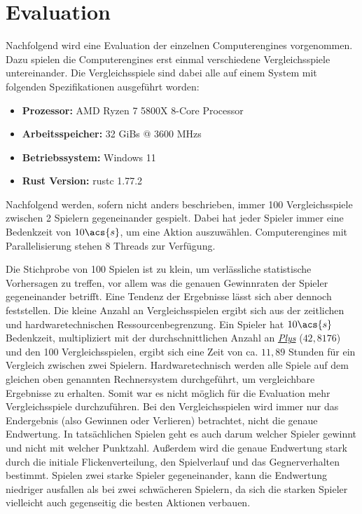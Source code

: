 \chapter{Evaluation}
\label{chapter:evaluation}


Nachfolgend wird eine Evaluation der einzelnen Computerengines vorgenommen. Dazu spielen die Computerengines erst einmal verschiedene Vergleichsspiele untereinander. Die Vergleichsspiele sind dabei alle auf einem System mit folgenden Spezifikationen ausgeführt worden:

\begin{itemize}
    \item \vspace{-0.15cm} \textbf{Prozessor:} \ac{AMD} Ryzen 7 5800X 8-Core Processor
    \item \vspace{-0.15cm} \textbf{Arbeitsspeicher:} 32 \acsp{GiB} @ 3600 \acsp{MHz}
    \item \vspace{-0.15cm} \textbf{Betriebssystem:} Windows 11
    \item \vspace{-0.15cm} \textbf{Rust Version:} rustc 1.77.2
\end{itemize}

Nachfolgend werden, sofern nicht anders beschrieben, immer 100 Vergleichsspiele zwischen 2 Spielern gegeneinander gespielt. Dabei hat jeder Spieler immer eine Bedenkzeit von $10\acs{s}$, um eine Aktion auszuwählen. Computerengines mit Parallelisierung stehen 8 Threads zur Verfügung.

Die Stichprobe von 100 Spielen ist zu klein, um verlässliche statistische Vorhersagen zu treffen, vor allem was die genauen Gewinnraten der Spieler gegeneinander betrifft. Eine Tendenz der Ergebnisse lässt sich aber dennoch feststellen. Die kleine Anzahl an Vergleichsspielen ergibt sich aus der zeitlichen und hardwaretechnischen Ressourcenbegrenzung. Ein Spieler hat $10\acs{s}$ Bedenkzeit, multipliziert mit der durchschnittlichen Anzahl an \hyperref[text:ply]{\emph{Plys}} ($42{,}8176$) und den 100 Vergleichsspielen, ergibt sich eine Zeit von ca. $11,89$ Stunden für ein Vergleich zwischen zwei Spielern. Hardwaretechnisch werden alle Spiele auf dem gleichen oben genannten Rechnersystem durchgeführt, um vergleichbare Ergebnisse zu erhalten. Somit war es nicht möglich für die Evaluation mehr Vergleichsspiele durchzuführen. Bei den Vergleichsspielen wird immer nur das Endergebnis (also Gewinnen oder Verlieren) betrachtet, nicht die genaue Endwertung. In tatsächlichen Spielen geht es auch darum welcher Spieler gewinnt und nicht mit welcher Punktzahl. Außerdem wird die genaue Endwertung stark durch die initiale Flickenverteilung, den Spielverlauf und das Gegnerverhalten bestimmt. Spielen zwei starke Spieler gegeneinander, kann die Endwertung niedriger ausfallen als bei zwei schwächeren Spielern, da sich die starken Spieler vielleicht auch gegenseitig die besten Aktionen verbauen.

